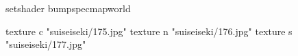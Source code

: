 setshader bumpspecmapworld

    texture c "suiseiseki/175.jpg"
    texture n "suiseiseki/176.jpg"
    texture s "suiseiseki/177.jpg"
